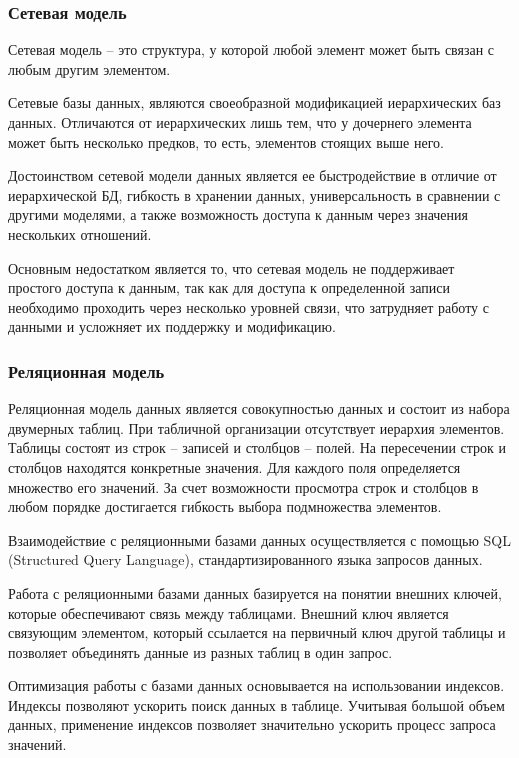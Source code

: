 \subsubsection{Сетевая модель}

Сетевая модель -- это структура, у которой любой элемент может быть связан
с любым другим элементом.

Сетевые базы данных, являются своеобразной модификацией иерархических баз данных. Отличаются от иерархических лишь тем, что у дочернего элемента может быть несколько предков, то есть, элементов стоящих выше него. 

Достоинством сетевой модели данных является ее быстродействие в отличие от иерархической БД, гибкость в хранении данных, универсальность в сравнении с другими моделями, а также возможность доступа к данным через значения нескольких отношений.

Основным недостатком является то, что сетевая модель не поддерживает простого доступа к данным, так как для доступа к определенной записи необходимо проходить через несколько уровней связи, что затрудняет работу с данными и усложняет их поддержку и модификацию. 

\subsubsection{Реляционная модель}
Реляционная модель данных является совокупностью данных и состоит из
набора двумерных таблиц. При табличной организации отсутствует
иерархия элементов. Таблицы состоят из строк -- записей и столбцов -- полей.
На пересечении строк и столбцов находятся конкретные значения. Для каждого
поля определяется множество его значений. За счет возможности просмотра
строк и столбцов в любом порядке достигается гибкость выбора подмножества
элементов.

Взаимодействие с реляционными базами данных осуществляется с помощью SQL (Structured Query Language)\cite{sql}, стандартизированного языка запросов данных.

Работа с реляционными базами данных базируется на понятии внешних ключей, которые обеспечивают связь между таблицами. Внешний ключ является связующим элементом, который ссылается на первичный ключ другой таблицы и позволяет объединять данные из разных таблиц в один запрос.

Оптимизация работы с базами данных основывается на использовании индексов. Индексы позволяют ускорить поиск данных в таблице. Учитывая большой объем данных, применение индексов позволяет значительно ускорить процесс запроса значений.

